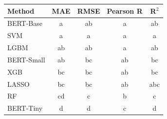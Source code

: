 \begin{tabular}{lcccc}
\toprule
Method & MAE & RMSE & Pearson R & R$^2$ \\
\midrule
BERT-Base & a & ab & a & ab \\
SVM & a & a & a & a \\
LGBM & ab & ab & a & ab \\
BERT-Small & ab & bc & ab & bc \\
XGB & bc & bc & ab & bc \\
LASSO & bc & bc & ab & abc \\
RF & cd & c & b & c \\
BERT-Tiny & d & d & c & d \\
\bottomrule
\end{tabular}
